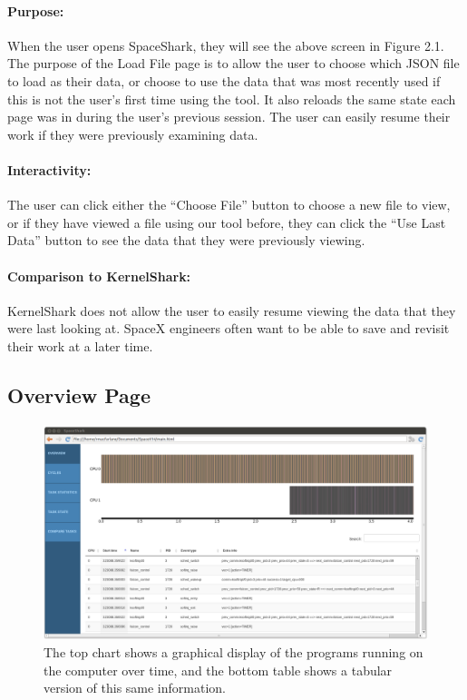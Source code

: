 \documentclass{hmcclinic}
\begin{document}
\paragraph{Purpose:}
When the user opens SpaceShark, they will see the above screen in Figure
2.1. The purpose of the Load File page is to allow the user to choose which JSON file to load as their data, 
or choose to use the data that was most recently used if this is not the user's first time using 
the tool. It also reloads the same state each page was in during
the user's previous session. The user can easily resume their work if they were previously examining data.

\paragraph{Interactivity:}
The user can click either the ``Choose File'' button to choose a new file to view, or if they have viewed a file using our tool before, they can click the ``Use Last Data'' button to see the data that they were previously viewing.

\paragraph{Comparison to KernelShark:}
KernelShark does not allow the user to easily resume viewing the data that they were last looking at. SpaceX engineers often want to be able to save and revisit their work at a later time. 


  \subsection{Overview Page} 
  
  \begin{figure}[H]
  \centering
      \includegraphics[width=5in]{overview-page.png}
  \caption{The top chart shows a graphical display of the programs running on the computer over time, and the bottom table shows a tabular version of this same information.}
  \end{figure}
\end{document}
